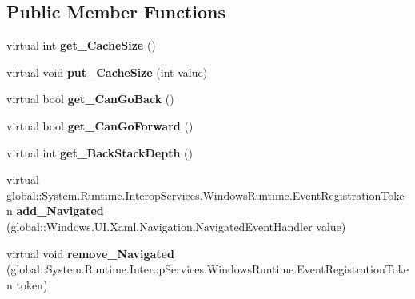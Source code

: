 \subsection*{Public Member Functions}
\begin{DoxyCompactItemize}
\item 
\mbox{\label{class_windows_1_1_u_i_1_1_xaml_1_1_controls_1_1_frame_a4feacaac243c53e320ffcf6ceba4a5e7}} 
virtual int {\bfseries get\+\_\+\+Cache\+Size} ()
\item 
\mbox{\label{class_windows_1_1_u_i_1_1_xaml_1_1_controls_1_1_frame_af1e1e012518d0402becbf9239646174d}} 
virtual void {\bfseries put\+\_\+\+Cache\+Size} (int value)
\item 
\mbox{\label{class_windows_1_1_u_i_1_1_xaml_1_1_controls_1_1_frame_ab2b52e19abf5dd97c35d8e4da92c57db}} 
virtual bool {\bfseries get\+\_\+\+Can\+Go\+Back} ()
\item 
\mbox{\label{class_windows_1_1_u_i_1_1_xaml_1_1_controls_1_1_frame_a85c6c5e01ec4c931d0b6f7752ea62bc4}} 
virtual bool {\bfseries get\+\_\+\+Can\+Go\+Forward} ()
\item 
\mbox{\label{class_windows_1_1_u_i_1_1_xaml_1_1_controls_1_1_frame_ac2a0cbed74e7e3a18163cbcb7a34def2}} 
virtual int {\bfseries get\+\_\+\+Back\+Stack\+Depth} ()
\item 
\mbox{\label{class_windows_1_1_u_i_1_1_xaml_1_1_controls_1_1_frame_a38b94e8bce03524a1c9b3c012074a6e8}} 
virtual global\+::\+System.\+Runtime.\+Interop\+Services.\+Windows\+Runtime.\+Event\+Registration\+Token {\bfseries add\+\_\+\+Navigated} (global\+::\+Windows.\+U\+I.\+Xaml.\+Navigation.\+Navigated\+Event\+Handler value)
\item 
\mbox{\label{class_windows_1_1_u_i_1_1_xaml_1_1_controls_1_1_frame_a6ba58ec5fb87b903e976124fe13e19c0}} 
virtual void {\bfseries remove\+\_\+\+Navigated} (global\+::\+System.\+Runtime.\+Interop\+Services.\+Windows\+Runtime.\+Event\+Registration\+Token token)

\end{DoxyCompactItemize}
